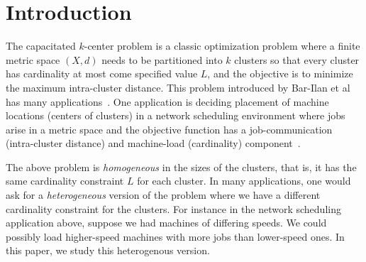\section{Introduction}
The capacitated $k$-center problem is a classic optimization problem where a finite metric space $(X,d)$ needs to be partitioned into $k$ clusters so that  every  cluster has cardinality at most
come specified value $L$, and the objective is to minimize the maximum intra-cluster distance. This problem introduced by Bar-Ilan et al~\cite{Bar-IlanKP93} has many applications~\cite{LuptonMY98,MorganL77,Murthy1983AnAA}. %
One application is deciding placement of machine locations (centers of clusters) in a network scheduling environment where jobs arise in a metric space and the objective function has a  job-communication (intra-cluster distance) and machine-load (cardinality)
component~\cite{PSW97}. %

The above problem is {\em homogeneous} in the sizes of the clusters, that is, it has the same cardinality constraint $L$ for each cluster. In many applications, one would ask for a \emph{heterogeneous} version of the problem where we have a different cardinality constraint for the clusters.
For instance in the network scheduling application above, suppose we had machines of differing speeds. We could possibly load higher-speed machines with more jobs than lower-speed ones. In this paper, we study  this heterogenous version.


